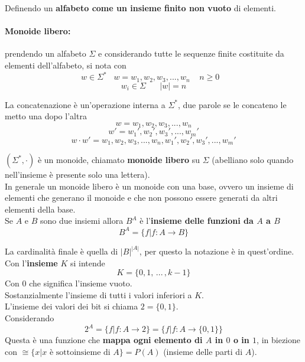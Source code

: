 \documentclass[11pt]{article}
\begin{document}
	Definendo un \textbf{alfabeto come un insieme finito non vuoto} di elementi. \\
	
	\paragraph{Monoide libero:} prendendo un alfabeto $\Sigma$ e considerando tutte le sequenze finite costituite da elementi dell'alfabeto, si nota con 
	$$w \in \Sigma^{\ast} \;\;\; w = w_1, w_2, w_3, ... , w_n \;\;\;\; n \geq 0 \;\;\;$$
	$$ w_i \in \Sigma \;\;\;\;\;\; |w| = n$$
	
	\newpage
	
	La concatenazione è un'operazione interna a $\Sigma^{\ast}$, due parole se le concateno le metto una dopo l'altra
	$$ w = w_1, w_2, w_3, ... , w_n $$ 
	$$ w' = w_1', w_2', w_3', ... , w_m' $$ 
	$$ w \cdot w' = w_1, w_2, w_3, ... , w_n, w_1', w_2', w_3', ... , w_m'  $$
	
	$(\Sigma^\ast, \cdot)$ è un monoide, chiamato \textbf{monoide libero} su $\Sigma$ (abelliano solo quando nell'insieme è presente solo una lettera). \\
	
	In generale un monoide libero è un monoide con una base, ovvero un insieme di elementi che generano il monoide e che non possono essere generati da altri elementi della base.\\
	
	Se $A$ e $B$ sono due insiemi allora $B^A$ è l'\textbf{insieme delle funzioni da $A$ a $B$}
	$$ B^A = \{f | f : A \rightarrow B\}$$
	
	La cardinalità finale è quella di $|B|^{|A|}$, per questo la notazione è in quest'ordine.\\
	
	Con l'\textbf{insieme} $K$ si intende 
	$$ K = \{0, 1, \, ... \, , k-1\}$$
	Con $0$ che significa l'insieme vuoto.\\
	
	Sostanzialmente l'insieme di tutti i valori inferiori a $K$.\\
	L'insieme dei valori dei bit si chiama $2 = \{0,1\}$.\\
	
	Considerando
	$$ 2^A = \{f | f : A \rightarrow 2\} = \{f | f : A \rightarrow \{0,1\}\}$$
	Questa è una funzione che \textbf{mappa ogni elemento di $A$ in $0$ o in $1$}, in biezione con $\cong \{x | x \text{ è sottoinsieme di } A\} = P(A)$ (insieme delle parti di $A$).\\
	
\end{document}
